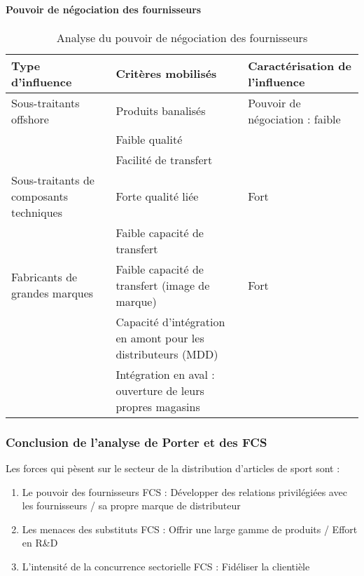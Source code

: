     \paragraph{Pouvoir de négociation des fournisseurs}
    
    \begin{table}[!ht]
      \begin{center}
	\begin{tabular}{p{4cm}|p{6cm}|p{5cm}}
	  Type d'influence & Critères mobilisés & Caractérisation de l'influence \\ \hline
	  Sous-traitants offshore & Produits banalisés & Pouvoir de négociation : faible \\
	  & Faible qualité & \\
	  & Facilité de transfert & \\ \hline
	  Sous-traitants de composants techniques & Forte qualité liée & Fort \\
	  & Faible capacité de transfert & \\ \hline
	  Fabricants de grandes marques & Faible capacité de transfert (image de marque) & Fort \\
	  & Capacité d'intégration en amont pour les distributeurs (MDD) & \\
	  & Intégration en aval : ouverture de leurs propres magasins & \\
	\end{tabular}
	\caption{Analyse du pouvoir de négociation des fournisseurs}
      \end{center}
    \end{table}
    
    \subsubsection{Conclusion de l'analyse de Porter et des FCS}
    
    Les forces qui pèsent sur le secteur de la distribution d'articles de sport sont :
    
    \begin{enumerate}
     \item Le pouvoir des fournisseurs
      \subitem FCS : Développer des relations privilégiées avec les fournisseurs / sa propre marque de distributeur
     \item Les menaces des substituts
      \subitem FCS : Offrir une large gamme de produits / Effort en R\&D
     \item L'intensité de la concurrence sectorielle
      \subitem FCS : Fidéliser la clientièle
    \end{enumerate}
